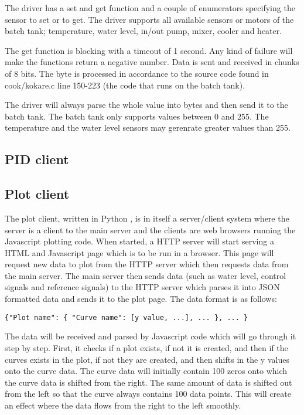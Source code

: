 \documentclass{article}
\begin{document}
The driver has a set and get function and a couple of enumerators specifying the sensor to set or to get. The driver supports all available sensors or motors of the batch tank; temperature, water level, in/out pump, mixer, cooler and heater.

The get function is blocking with a timeout of 1 second. Any kind of failure will make the functions return a negative number. Data is sent and received in chunks of 8 bits. The byte is processed in accordance to the source code found in cook/kokare.c line 150-223\cite{kokare.c} (the code that runs on the batch tank). 

The driver will always parse the whole value into bytes and then send it to the batch tank. The batch tank only supports values between 0 and 255. The temperature and the water level sensors may gerenrate greater values than 255. 

\subsection{PID client}

\subsection{Plot client}
The plot client, written in Python \cite{python}, is in itself a server/client system where the server is a client to the main server and the clients are web browsers running the Javascript plotting code. When started, a HTTP server will start serving a HTML and Javascript page which is to be run in a browser. This page will request new data to plot from the HTTP server which then requests data from the main server. The main server then sends data (such as water level, control signals and reference signals) to the HTTP server which parses it into JSON \cite{json} formatted data and sends it to the plot page. The data format is as follows:
\begin{verbatim}
{"Plot name": { "Curve name": [y value, ...], ... }, ... }
\end{verbatim}
The data will be received and parsed by Javascript code which will go through it step by step. First, it checks if a plot exists, if not it is created, and then if the curves exists in the plot, if not they are created, and then shifts in the y values onto the curve data. The curve data will initially contain 100 zeros onto which the curve data is shifted from the right. The same amount of data is shifted out from the left so that the curve always contains 100 data points. This will create an effect where the data flows from the right to the left smoothly.
\end{document}
